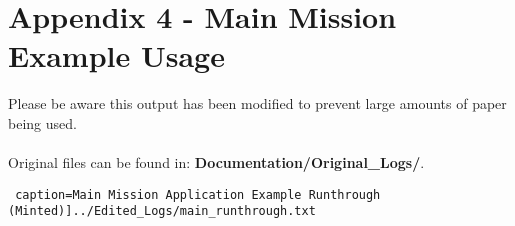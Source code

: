 \documentclass[12pt]{article}
\begin{document}
\section*{Appendix 4 - Main Mission Example Usage}

Please be aware this output has been modified to prevent large amounts of paper being used.\\\\
Original files can be found in: \textbf{Documentation/Original\_Logs/}.

\texttt{ caption=Main Mission Application Example Runthrough (Minted)]{../Edited_Logs/main_runthrough.txt}}
\end{document}
